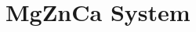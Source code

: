 \documentclass[a4paper,12pt,oneside]{report}%
\begin{document}
\begin{comment}
ABED 	? 	Angstrom Beam Electron Diffraction 
BMG 	? 	Bulk Metallic Glass
C_p 	? 	Heat Capacity ( J  )
c_p 	? 	Specific Heat Capacity ( J / gK )
CVD 	? 	Chemical Vapour Deposition
DC 	? 	Direct Current ( I )
DSC 	? 	Differential Scanning Calorimetry
E 	? 	Young?s Modulus ( GPa )
E_A	? 	Applied Potential ( V )
E_OCP	? 	Open Circuit Potential ( V )
E_corr	? 	Corrosion Potential ( V )
FDA 	? 	Food and Drug Administration
G	? 	Gibb?s Free Energy ( J )
GFA 	? 	Glass Forming Ability
H 	? 	Enthalpy ( J )
h 	? 	Specific Enthalpy ( J / g )
H_0 	? 	Absolute Zero Enthalpy ( J )
i	? 	Current Density ( A/cm2¬ )
i_0	? 	Exchange Current Density ( A/cm2¬ )
i_corr	? 	Corrosion Current Density ( A/cm2¬ )
LRO	? 	Long Range Order 
m 	? 	Fragility 
MG 	? 	Metallic Glass
MRO 	? 	Medium Range Order
PCL 	? 	Polycaprolactone
PDP 	? 	Potentiodynamic Polarisation
PLD 	? 	Pulse Laser Deposition
PVD 	? 	Physical Vapour Deposition
r	? 	Nucleus Radius ( m )
R_c 	? 	Critical Cooling Rate ( K / s )
RE	? 	Rare Earth Elements
S	? 	Entropy ( J / K )
s	? 	Specific Entropy ( J / gK )
SCL 	? 	Super Cooled Liquid
SCLR 	? 	Super Cooled Liquid Region
SMG 	? 	Ultrastable Metallic Glass
SRO 	? 	Short Range Order
T	? 	Temperature ( K )
T_f 	? 	Fictive Temperature ( K )
TFMG 	? 	Thin Film Metallic Glass
T_g 	? 	Glass Transition Temperature ( K )
TGA 	? 	Therapeutic Goods Administration
T_i 	? 	Intersection Temperature ( K )
T_k 	? 	Kauzmann Temperature ( K )
T_l 	? 	Liquidus Temperature ( K )
T_m 	? 	Melting Temperature ( K )
T_onset 	? 	Onset Temperature ( K )
TPF 	? 	Thermoplastic Forming
T_rg	? 	Reduced Glass Transition Temperature ( T_g/T_m )
T_sub 	? 	Substrate Temperature ( K )
t_max 	? 	Maximum Sample Thickness ( mm )
T_x 	? 	Crystallisation Temperature ( K )
STEM 	? 	Scan Transmission Electron Microscopy 
UHV 	? 	Ultrahigh Vacuum 
UNSW 	? 	University of New South Wales 
USG 	? 	Ultrastable Glass
V 	? 	Volume ( m^3 )
v 	? 	Specific Volume ( m^3  / kg )
VD 	? 	Vapour Deposition
V_m	? 	Molar Volume ( m^3  / mol )
?	? 	Tafel Slope
?_SL	? 	Surface Energy ( J / m^2 )
?G	? 	Change in Gibb?s Free Energy ( J )
?G_V	? 	Reduction in Volume Energy ( J / m^3 )
?T 	? 	Super Cooled Liquid Region ( K )
?T_g 	? 	Enhanced Glass Transition Temperature ( K )
?_k 	? 	Proportion along the Energy Landscape
? 	? 	Viscosity ( Pa s ) 
?	? 	Overpotential ( V )
?	? 	Density ( kg / m^3 )
\end{comment}

\newpage

\section{MgZnCa System}
\end{document}
